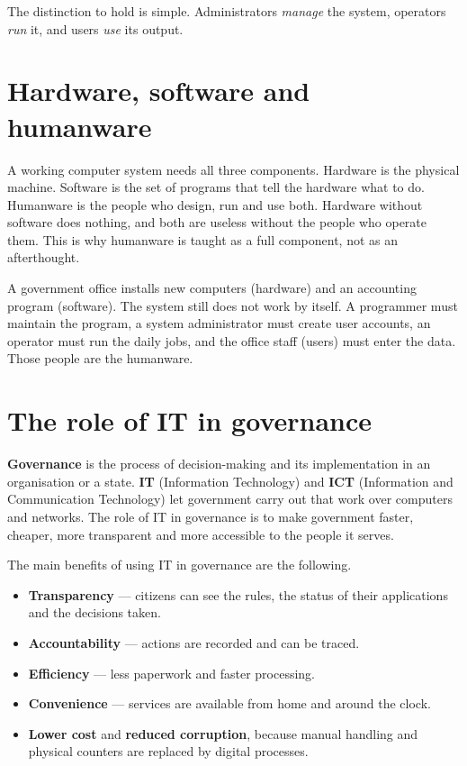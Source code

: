 The distinction to hold is simple. Administrators \emph{manage} the system,
operators \emph{run} it, and users \emph{use} its output.

\section{Hardware, software and humanware}
A working computer system needs all three components. Hardware is the
physical machine. Software is the set of programs that tell the hardware what
to do. Humanware is the people who design, run and use both. Hardware without
software does nothing, and both are useless without the people who operate
them. This is why humanware is taught as a full component, not as an
afterthought.

\begin{example}
A government office installs new computers (hardware) and an accounting
program (software). The system still does not work by itself. A programmer
must maintain the program, a system administrator must create user accounts,
an operator must run the daily jobs, and the office staff (users) must enter
the data. Those people are the humanware.
\end{example}

\section{The role of IT in governance}
\textbf{Governance} is the process of decision-making and its implementation
in an organisation or a state. \textbf{IT} (Information Technology) and
\textbf{ICT} (Information and Communication Technology) let government carry
out that work over computers and networks. The role of IT in governance is to
make government faster, cheaper, more transparent and more accessible to the
people it serves.

The main benefits of using IT in governance are the following.

\begin{itemize}
  \item \textbf{Transparency} --- citizens can see the rules, the status of
    their applications and the decisions taken.
  \item \textbf{Accountability} --- actions are recorded and can be traced.
  \item \textbf{Efficiency} --- less paperwork and faster processing.
  \item \textbf{Convenience} --- services are available from home and around
    the clock.
  \item \textbf{Lower cost} and \textbf{reduced corruption}, because manual
    handling and physical counters are replaced by digital processes.
\end{itemize}

